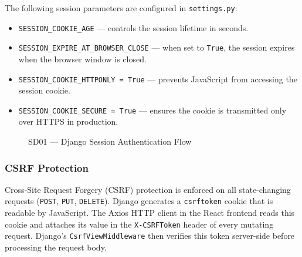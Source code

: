 \begin{sloppypar}
The following session parameters are configured in \texttt{settings.py}:

\begin{itemize}
  \item \texttt{SESSION\_COOKIE\_AGE} --- controls the session lifetime in
    seconds.
  \item \texttt{SESSION\_EXPIRE\_AT\_BROWSER\_CLOSE} --- when set to
    \texttt{True}, the session expires when the browser window is closed.
  \item \texttt{SESSION\_COOKIE\_HTTPONLY = True} --- prevents JavaScript
    from accessing the session cookie.
  \item \texttt{SESSION\_COOKIE\_SECURE = True} --- ensures the cookie is
    transmitted only over HTTPS in production.
\end{itemize}

\begin{figure}[H]
  \centering
  \caption{SD01 --- Django Session Authentication Flow}
  \label{fig:sd01_auth}
\end{figure}

\subsubsection{CSRF Protection}

Cross-Site Request Forgery (CSRF) protection is enforced on all state-changing
requests (\texttt{POST}, \texttt{PUT}, \texttt{DELETE}). Django generates a
\texttt{csrftoken} cookie that is readable by JavaScript. The Axios HTTP client
in the React frontend reads this cookie and attaches its value in the
\texttt{X-CSRFToken} header of every mutating request. Django's
\texttt{CsrfViewMiddleware} then verifies this token server-side before
processing the request body.


\end{sloppypar}
